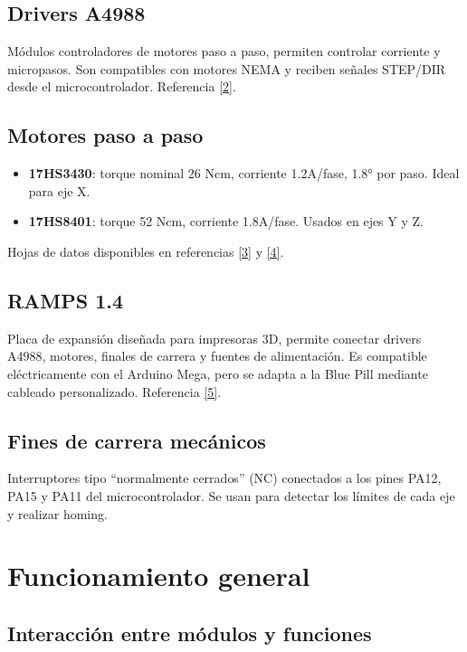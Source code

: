 \documentclass[12pt]{article}
\begin{document}
\subsection{Drivers A4988}
Módulos controladores de motores paso a paso, permiten controlar corriente y micropasos. Son compatibles con motores NEMA y reciben señales STEP/DIR desde el microcontrolador. Referencia \hyperref[ref2]{[2]}.

\subsection{Motores paso a paso}
\begin{itemize}
  \item \textbf{17HS3430}: torque nominal 26 Ncm, corriente 1.2A/fase, 1.8° por paso. Ideal para eje X.
  \item \textbf{17HS8401}: torque 52 Ncm, corriente 1.8A/fase. Usados en ejes Y y Z.
\end{itemize}
Hojas de datos disponibles en referencias \hyperref[ref3]{[3]} y \hyperref[ref4]{[4]}.

\subsection{RAMPS 1.4}
Placa de expansión diseñada para impresoras 3D, permite conectar drivers A4988, motores, finales de carrera y fuentes de alimentación. Es compatible eléctricamente con el Arduino Mega, pero se adapta a la Blue Pill mediante cableado personalizado. Referencia \hyperref[ref5]{[5]}.

\subsection{Fines de carrera mecánicos}
Interruptores tipo “normalmente cerrados” (NC) conectados a los pines PA12, PA15 y PA11 del microcontrolador. Se usan para detectar los límites de cada eje y realizar homing.


\section{Funcionamiento general}
\subsection*{Interacción entre módulos y funciones}
\end{document}
